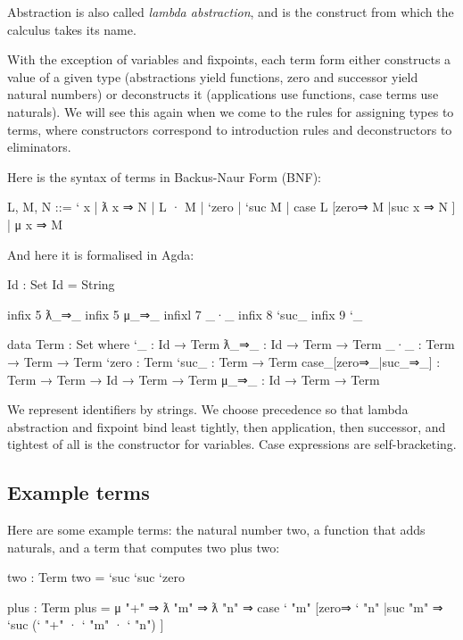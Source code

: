 Abstraction is also called \emph{lambda abstraction}, and is the
construct from which the calculus takes its name.

With the exception of variables and fixpoints, each term form either
constructs a value of a given type (abstractions yield functions, zero
and successor yield natural numbers) or deconstructs it (applications
use functions, case terms use naturals). We will see this again when we
come to the rules for assigning types to terms, where constructors
correspond to introduction rules and deconstructors to eliminators.

Here is the syntax of terms in Backus-Naur Form (BNF):

\begin{myDisplay}
L, M, N  ::=
  ` x  |  ƛ x ⇒ N  |  L · M  |
  `zero  |  `suc M  |  case L [zero⇒ M |suc x ⇒ N ]  |
  μ x ⇒ M
\end{myDisplay}

And here it is formalised in Agda:

\begin{fence}
\begin{code}
Id : Set
Id = String

infix  5  ƛ_⇒_
infix  5  μ_⇒_
infixl 7  _·_
infix  8  `suc_
infix  9  `_

data Term : Set where
  `_                      :  Id → Term
  ƛ_⇒_                    :  Id → Term → Term
  _·_                     :  Term → Term → Term
  `zero                   :  Term
  `suc_                   :  Term → Term
  case_[zero⇒_|suc_⇒_]    :  Term → Term → Id → Term → Term
  μ_⇒_                    :  Id → Term → Term
\end{code}
\end{fence}

We represent identifiers by strings. We choose precedence so that lambda
abstraction and fixpoint bind least tightly, then application, then
successor, and tightest of all is the constructor for variables. Case
expressions are self-bracketing.

\hypertarget{example-terms}{%
\subsection{Example terms}\label{example-terms}}

Here are some example terms: the natural number two, a function that
adds naturals, and a term that computes two plus two:

\begin{fence}
\begin{code}
two : Term
two = `suc `suc `zero

plus : Term
plus = μ "+" ⇒ ƛ "m" ⇒ ƛ "n" ⇒
         case ` "m"
           [zero⇒ ` "n"
           |suc "m" ⇒ `suc (` "+" · ` "m" · ` "n") ]
\end{code}
\end{fence}


